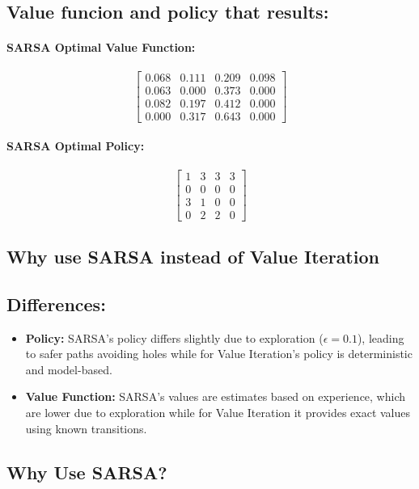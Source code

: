 \documentclass{article}
\begin{document}
\subsection*{Value funcion and policy that results:}

\paragraph{SARSA Optimal Value Function:}
\[
\begin{bmatrix}
0.068 & 0.111 & 0.209 & 0.098 \\
0.063 & 0.000 & 0.373 & 0.000 \\
0.082 & 0.197 & 0.412 & 0.000 \\
0.000 & 0.317 & 0.643 & 0.000
\end{bmatrix}
\]

\paragraph{SARSA Optimal Policy:}
\[
\begin{bmatrix}
1 & 3 & 3 & 3 \\
0 & 0 & 0 & 0 \\
3 & 1 & 0 & 0 \\
0 & 2 & 2 & 0
\end{bmatrix}
\]

\subsection*{Why use SARSA instead of Value Iteration}

\subsection*{Differences:}

\begin{itemize}
    \item \textbf{Policy:} SARSA's policy differs slightly due to exploration (\(\epsilon = 0.1\)), leading to safer paths avoiding holes while for 
    Value Iteration's policy is deterministic and model-based.
    \item \textbf{Value Function:} SARSA's values are estimates based on experience, which are lower due to exploration while for 
    Value Iteration it provides exact values using known transitions.
\end{itemize}

\subsection*{Why Use SARSA?}
\end{document}
